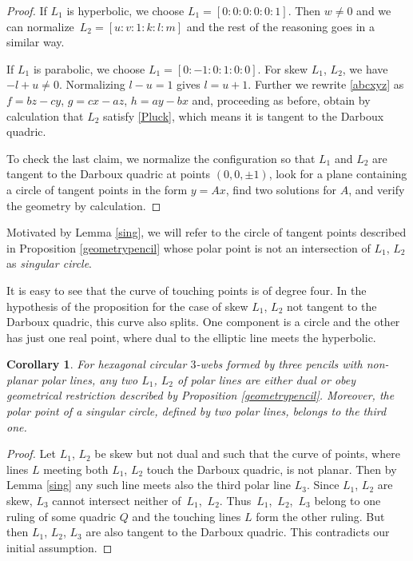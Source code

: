 \documentclass[pdftex]{sigma}
\numberwithin{equation}{section}
\newtheorem{Corollary}[Theorem]{Corollary}
\begin{document}
\begin{proof}
If $L_1$ is hyperbolic, we choose $L_1=[0:0:0:0:0:1]$. Then $w\ne 0$ and we can normalize~${L_2=[u:v:1:k:l:m]}$ and the rest of the reasoning goes in a similar way.

If $L_1$ is parabolic, we choose $L_1=[0:-1:0:1:0:0]$. For skew $L_1$, $L_2$, we have $-l+u\ne 0$. Normalizing $l-u=1$ gives $l=u+1$. Further we rewrite \eqref{abcxyz} as
$
 f = b z - c y$, $ g = cx-a z$, $ h = a y - b x
 $
 and, proceeding as before, obtain by calculation that $L_2$ satisfy \eqref{Pluck}, which means it is tangent to the Darboux quadric.

 To check the last claim, we normalize the configuration so that $L_1$ and $L_2$ are tangent to the Darboux quadric at points $(0,0,\pm 1)$, look for a plane containing a circle of tangent points in the form $y=Ax$, find two solutions for $A$, and verify the geometry by calculation.
 \end{proof}

\begin{Definition}
 Motivated by Lemma \ref{sing}, we will refer to the circle of tangent points described in Proposition \ref{geometrypencil} whose polar point is not an intersection of $L_1$, $L_2$ as {\it singular circle}.
\end{Definition}

\begin{Remark}
 It is easy to see that the curve of touching points is of degree four. In the hypothesis of the proposition for the case of skew $L_1$, $L_2$ not tangent to the Darboux quadric, this curve also splits. One component is a circle and the other has just one real point, where dual to the elliptic line meets the hyperbolic.
 \end{Remark}

\begin{Corollary}\label{singcircle}
For hexagonal circular $3$-webs formed by three pencils with non-planar polar lines,
any two $L_1$, $L_2$ of polar lines are either dual or obey geometrical restriction described by Proposition {\rm\ref{geometrypencil}}. Moreover, the polar point of a singular circle, defined by two polar lines, belongs to the third one.
\end{Corollary}
\begin{proof}Let $L_1$, $L_2$ be skew but not dual and such that the curve of points, where lines $L$ meeting both $L_1$, $L_2$ touch the Darboux quadric, is not planar. Then by Lemma \ref{sing} any such line meets also the third polar line $L_3$. Since $L_1$, $L_2$ are skew, $L_3$ cannot intersect neither of~$L_1$,~$L_2$. Thus~$L_1$,~$L_2$,~$L_3$ belong to one ruling of some quadric $Q$ and the touching lines $L$ form the other ruling. But then $L_1$, $L_2$, $L_3$ are also tangent to the Darboux quadric. This contradicts our initial assumption.
\end{proof}
\end{document}
